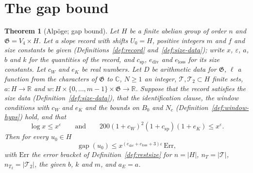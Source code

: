\documentclass[11pt]{amsbook}
\theoremstyle{plain}
\newtheorem{theorem}{Theorem}[section]
\theoremstyle{definition}
\theoremstyle{remark}
\numberwithin{equation}{section}
\numberwithin{figure}{chapter}
\numberwithin{table}{chapter}
\newcommand{\R}{\mathbb{R}}
\renewcommand{\C}{\mathbb{C}}
\newcommand{\eps}{\varepsilon}
\newcommand{\GG}{\mathfrak{G}}
\newcommand{\Top}{\mathcal{T}}
\newcommand{\gap}{\operatorname{gap}}
\newcommand{\Err}{\mathrm{Err}}
\begin{document}
\section{The gap bound}
\begin{figure}[tbp]
\centering

\end{figure}

\begin{theorem}[Alp\"oge; gap bound]\label{thm:gap}
Let $H$ be a finite abelian group of order $n$ and $\GG=V_4\times H$.
Let a slope record with shifts $U_0=H$, positive integers $m$ and $f$
and size constants be given (Definitions~\ref{def:record}
and~\ref{def:size-data}); write $x$, $\eps$, $a$, $b$ and $k$ for
the quantities of the record, and $c_{\mathrm{sp}}$,
$e_{\mathrm{div}}$ and $e_{\mathrm{loss}}$ for its size constants. Let
$c_W$ and $e_K$ be real numbers. Let $D$ be arithmetic data for $\GG$,
$\ell$ a function from the
characters of $\GG$ to $\C$, $N\ge1$ an integer, $\Top,\Top_2\subset
H$ finite sets, $a\colon H\to\R$ and
$w\colon H\times\{0,\dots,m-1\}\times\GG\to\R$.
Suppose that the record satisfies the size data
(Definition~\ref{def:size-data}), that the identification clause, the
window conditions with $c_W$ and $e_K$ and the bounds on $B_0$ and
$N_c$ (Definition~\ref{def:window-hyps}) hold, and that
\[
\log x\le x^\eps\qquad\text{and}\qquad
200(1+c_W)^2(1+c_{\mathrm{sp}})(1+e_K)\le x^\eps.
\]
Then for every $u_0\in H$
\[
\gap(u_0)\le x^{(e_{\mathrm{div}}+e_{\mathrm{loss}}+3)\eps}\,\Err,
\]
with $\Err$ the error bracket of Definition~\ref{def:restsize} for
$n=|H|$, $n_T=|\Top|$, $n_{T_2}=|\Top_2|$, the given $b$, $k$ and
$m$, and $a_E=a$.
\end{theorem}
\end{document}
